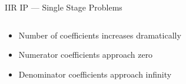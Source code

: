 \documentclass{beamer}
\begin{document}
\begin{frame}{IIR IP --- Single Stage Problems}
  \begin{columns}[T]
    \begin{column}[T]{5cm}
      \begin{itemize}[<+>]
      \item Number of coefficients increases dramatically
      \item Numerator coefficients approach zero
      \item Denominator coefficients approach infinity
      \end{itemize}
    \end{column}
    \begin{column}[T]{5cm}
    \end{column}
  \end{columns}
\end{frame}
\end{document}
